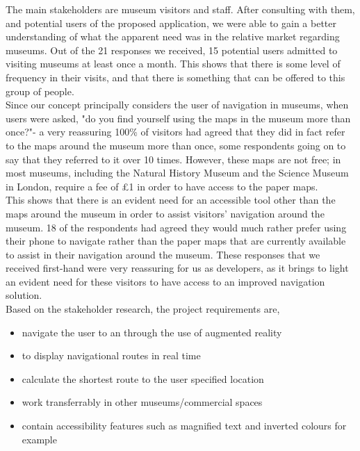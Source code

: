 
The main stakeholders are museum visitors and staff. After consulting with them, and potential users of the proposed application, we were able to gain a better understanding of what the apparent need was in the relative market regarding museums. Out of the 21 responses we received, 15 potential users admitted to visiting museums at least once a month. This shows that there is some level of frequency in their visits, and that there is something that can be offered to this group of people.\\

Since our concept principally considers the user of navigation in museums, when users were asked, "do you find yourself using the maps in the museum more than once?"- a very reassuring 100\% of visitors had agreed that they did in fact refer to the maps around the museum more than once, some respondents going on to say that they referred to it over 10 times. However, these maps are not free; in most museums, including the Natural History Museum and the Science Museum in London, require a fee of £1 in order to have access to the paper maps.\\

This shows that there is an evident need for an accessible tool other than the maps around the museum in order to assist visitors' navigation around the museum. 18 of the respondents had agreed they would much rather prefer using their phone to navigate rather than the paper maps that are currently available to assist in their navigation around the museum. These responses that we received first-hand were very reassuring for us as developers, as it brings to light an evident need for these visitors to have access to an improved navigation solution.\\

Based on the stakeholder research, the project requirements are, 

\begin{itemize}
    \item navigate the user to an  through the use of augmented reality
    \item to display navigational routes in real time
    \item calculate the shortest route to the user specified location 
    \item work transferrably in other museums/commercial spaces
    \item contain accessibility features such as magnified text and inverted colours for example
\end{itemize}